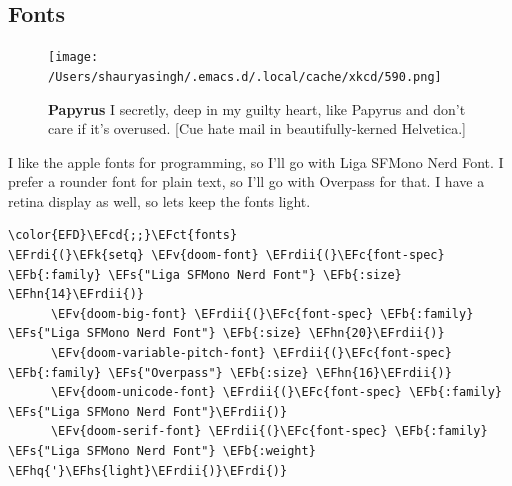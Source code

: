 \documentclass{scrartcl}
\newcommand{\EFk}[1]{\textcolor{EFk}{#1}} %
\newcommand{\EFs}[1]{\textcolor{EFs}{#1}} %
\newcommand{\EFb}[1]{\textcolor{EFb}{#1}} %
\newcommand{\EFct}[1]{\textcolor{EFct}{#1}} %
\newcommand{\EFc}[1]{\textcolor{EFc}{#1}} %
\newcommand{\EFv}[1]{\textcolor{EFv}{#1}} %
\newcommand{\EFcd}[1]{\textcolor{EFcd}{#1}} %
\newcommand{\EFhn}[1]{\textcolor{EFhn}{\textbf{#1}}} %
\newcommand{\EFhq}[1]{\textcolor{EFhq}{#1}} %
\newcommand{\EFhs}[1]{\textcolor{EFhs}{#1}} %
\newcommand{\EFrdi}[1]{\textcolor{EFrdi}{#1}} %
\newcommand{\EFrdii}[1]{\textcolor{EFrdii}{#1}} %
\begin{document}
\subsection{Fonts}
\label{sec:org4a92ea3}
\begin{figure}[!htb]
	  \centering
	  \texttt{[image: /Users/shauryasingh/.emacs.d/.local/cache/xkcd/590.png]}
  \caption*{\label{xkcd:590} \textbf{Papyrus} I secretly, deep in my guilty heart, like Papyrus and don't care if it's overused. [Cue hate mail in beautifully-kerned Helvetica.]}
	\end{figure}

I like the apple fonts for programming, so I'll go with Liga SFMono Nerd Font. I
prefer a rounder font for plain text, so I'll go with Overpass for that. I have a retina display as well, so lets keep the fonts light.
\begin{Code}
\begin{Verbatim}[]
\color{EFD}\EFcd{;;}\EFct{fonts}
\EFrdi{(}\EFk{setq} \EFv{doom-font} \EFrdii{(}\EFc{font-spec} \EFb{:family} \EFs{"Liga SFMono Nerd Font"} \EFb{:size} \EFhn{14}\EFrdii{)}
      \EFv{doom-big-font} \EFrdii{(}\EFc{font-spec} \EFb{:family} \EFs{"Liga SFMono Nerd Font"} \EFb{:size} \EFhn{20}\EFrdii{)}
      \EFv{doom-variable-pitch-font} \EFrdii{(}\EFc{font-spec} \EFb{:family} \EFs{"Overpass"} \EFb{:size} \EFhn{16}\EFrdii{)}
      \EFv{doom-unicode-font} \EFrdii{(}\EFc{font-spec} \EFb{:family} \EFs{"Liga SFMono Nerd Font"}\EFrdii{)}
      \EFv{doom-serif-font} \EFrdii{(}\EFc{font-spec} \EFb{:family} \EFs{"Liga SFMono Nerd Font"} \EFb{:weight} \EFhq{'}\EFhs{light}\EFrdii{)}\EFrdi{)}
\end{Verbatim}
\end{Code}
\end{document}
